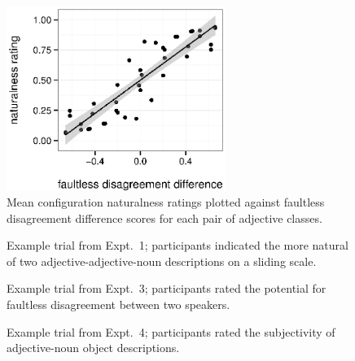 \documentclass{pnastwo}
\begin{document}
\begin{figure}
	\centering\includegraphics[width=2.8in]{plots/naturalness-faultless-configuration.eps}
	\caption{Mean configuration naturalness ratings plotted against faultless disagreement difference scores for each pair of adjective classes.}\label{naturalness-faultless}
\end{figure}


\begin{figure}[h]
	\centering
	\caption{Example trial from Expt.\ 1; participants indicated the more natural of two adjective-adjective-noun descriptions on a sliding scale.}\label{order-trial}
\end{figure}

\begin{figure}[h]
	\centering
	\caption{Example trial from Expt.\ 3; participants rated the potential for faultless disagreement between two speakers.}\label{faultless-trial}
\end{figure}

\begin{figure}[h]
	\centering
	\caption{Example trial from Expt.\ 4; participants rated the subjectivity of adjective-noun object descriptions.}\label{subjectivity-trial}
\end{figure}
\end{document}
